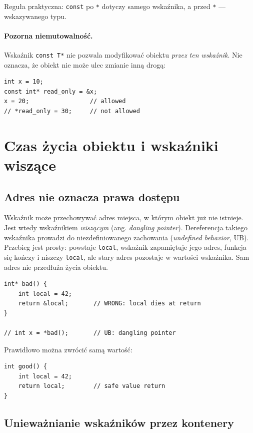 Reguła praktyczna: \texttt{const} po \texttt{*} dotyczy samego
wskaźnika, a przed \texttt{*} --- wskazywanego typu.

\paragraph{Pozorna niemutowalność.}
Wskaźnik \texttt{const T*} nie pozwala modyfikować obiektu
\emph{przez ten wskaźnik}. Nie oznacza, że obiekt nie może ulec zmianie
inną drogą:

\begin{lstlisting}
int x = 10;
const int* read_only = &x;
x = 20;                 // allowed
// *read_only = 30;     // not allowed
\end{lstlisting}

\section{Czas życia obiektu i wskaźniki wiszące}

\subsection{Adres nie oznacza prawa dostępu}

Wskaźnik może przechowywać adres miejsca, w którym obiekt już
nie istnieje. Jest wtedy wskaźnikiem \emph{wiszącym}
(ang. \emph{dangling pointer}). Dereferencja takiego wskaźnika
prowadzi do niezdefiniowanego zachowania (\emph{undefined behavior}, UB).
Przebieg jest prosty: powstaje \texttt{local}, wskaźnik zapamiętuje
jego adres, funkcja się kończy i niszczy \texttt{local}, ale stary adres
pozostaje w wartości wskaźnika. Sam adres nie przedłuża życia obiektu.

\begin{lstlisting}
int* bad() {
    int local = 42;
    return &local;       // WRONG: local dies at return
}

// int x = *bad();       // UB: dangling pointer
\end{lstlisting}

Prawidłowo można zwrócić samą wartość:

\begin{lstlisting}
int good() {
    int local = 42;
    return local;        // safe value return
}
\end{lstlisting}

\subsection{Unieważnianie wskaźników przez kontenery}

